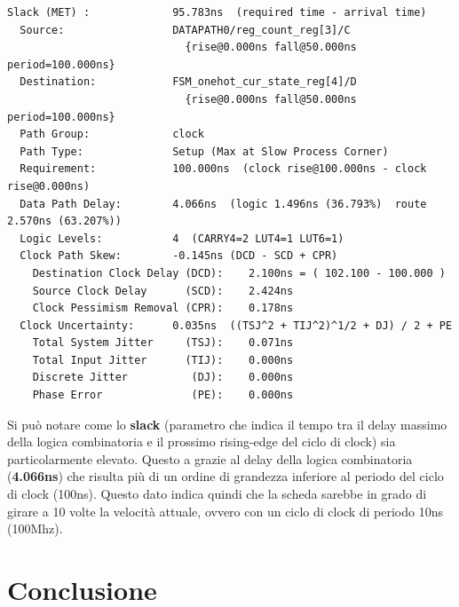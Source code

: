 \documentclass[a4paper]{report}
\begin{document}
\begin{verbatim}
Slack (MET) :             95.783ns  (required time - arrival time)
  Source:                 DATAPATH0/reg_count_reg[3]/C
                            {rise@0.000ns fall@50.000ns period=100.000ns}
  Destination:            FSM_onehot_cur_state_reg[4]/D
                            {rise@0.000ns fall@50.000ns period=100.000ns}
  Path Group:             clock
  Path Type:              Setup (Max at Slow Process Corner)
  Requirement:            100.000ns  (clock rise@100.000ns - clock rise@0.000ns)
  Data Path Delay:        4.066ns  (logic 1.496ns (36.793%)  route 2.570ns (63.207%))
  Logic Levels:           4  (CARRY4=2 LUT4=1 LUT6=1)
  Clock Path Skew:        -0.145ns (DCD - SCD + CPR)
    Destination Clock Delay (DCD):    2.100ns = ( 102.100 - 100.000 ) 
    Source Clock Delay      (SCD):    2.424ns
    Clock Pessimism Removal (CPR):    0.178ns
  Clock Uncertainty:      0.035ns  ((TSJ^2 + TIJ^2)^1/2 + DJ) / 2 + PE
    Total System Jitter     (TSJ):    0.071ns
    Total Input Jitter      (TIJ):    0.000ns
    Discrete Jitter          (DJ):    0.000ns
    Phase Error              (PE):    0.000ns
\end{verbatim}

Si può notare come lo \textbf{slack} (parametro che indica il tempo tra il delay massimo della logica combinatoria e il prossimo rising-edge del ciclo di clock) sia particolarmente elevato. Questo a grazie al delay della logica combinatoria (\textbf{4.066ns}) che risulta più di un ordine di grandezza inferiore al periodo del ciclo di clock (100ns).
Questo dato indica quindi che la scheda sarebbe in grado di girare a 10 volte la velocità attuale, ovvero con un ciclo di clock di periodo 10ns (100Mhz).


\chapter{Conclusione}
\end{document}
